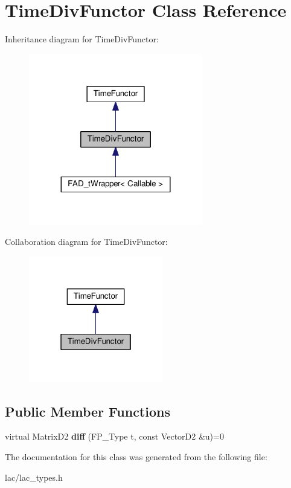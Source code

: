 \hypertarget{classTimeDivFunctor}{}\section{Time\+Div\+Functor Class Reference}
\label{classTimeDivFunctor}


Inheritance diagram for Time\+Div\+Functor\+:\nopagebreak
\begin{figure}[H]
\begin{center}
\leavevmode
\includegraphics[width=215pt]{classTimeDivFunctor__inherit__graph}
\end{center}
\end{figure}


Collaboration diagram for Time\+Div\+Functor\+:\nopagebreak
\begin{figure}[H]
\begin{center}
\leavevmode
\includegraphics[width=166pt]{classTimeDivFunctor__coll__graph}
\end{center}
\end{figure}
\subsection*{Public Member Functions}
\begin{DoxyCompactItemize}
\item 
\mbox{\label{classTimeDivFunctor_acbdba504a35a59e0b6687718b9d7d8ff}} 
virtual Matrix\+D2 {\bfseries diff} (F\+P\+\_\+\+Type t, const Vector\+D2 \&u)=0
\end{DoxyCompactItemize}


The documentation for this class was generated from the following file\+:\begin{DoxyCompactItemize}
\item 
lac/lac\+\_\+types.\+h\end{DoxyCompactItemize}
